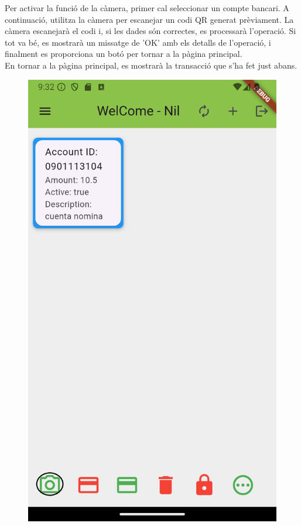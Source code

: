 \documentclass[a4paper,12pt,twoside]{ThesisStyle}
\begin{document}
Per activar la funció de la càmera, primer cal seleccionar un compte bancari. A continuació, utilitza la càmera per escanejar un codi QR generat prèviament. La càmera escanejarà el codi i, si les dades són correctes, es processarà l'operació. Si tot va bé, es mostrarà un missatge de 'OK' amb els detalls de l'operació, i finalment es proporciona un botó per tornar a la pàgina principal.\\

En tornar a la pàgina principal, es mostrarà la transacció que s'ha fet just abans.

\begin{figure}[h]
    \centering
    \begin{minipage}{0.31\textwidth}
        \includegraphics[width=\linewidth]{imatges/mainpageAccount1.png}

\end{minipage}
\end{figure}
\end{document}
